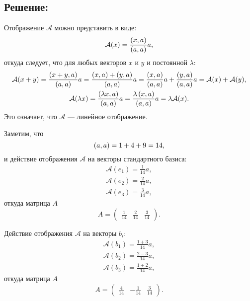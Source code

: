 \documentclass[12pt]{article}
\begin{document}
    \subsection*{Решение:}
    Отображение $\mathcal{A}$ можно представить в виде:
    \[
        \mathcal{A}(x)
        = \frac{\left ( x, a \right )}{\left ( a, a \right )} a ,
    \]
    откуда следует, что для любых векторов $x$ и $y$ и постоянной $\lambda$:
    \begin{gather*}
        \mathcal{A}(x + y)
        = \frac{\left ( x + y, a \right )}{\left ( a, a \right )} a
        = \frac{\left ( x, a \right ) + \left ( y, a \right )}{\left ( a, a \right )} a
        = \frac{\left ( x, a \right )}{\left ( a, a \right )} a + \frac{\left ( y, a \right )}{\left ( a, a \right )} a
        = \mathcal{A}(x) + \mathcal{A}(y), \\
        \mathcal{A}(\lambda x)
        = \frac{\left ( \lambda x, a \right )}{\left ( a, a \right )} a
        = \frac{\lambda  \left ( x, a \right )}{\left ( a, a \right )} a
        = \lambda \mathcal{A}(x) .
    \end{gather*}
    Это означает, что $\mathcal{A}$ --- линейное отображение.

    Заметим, что
    \[
        \left ( a, a \right ) = 1 + 4 + 9 = 14,
    \]
    и действие отображения $\mathcal{A}$ на векторы стандартного базиса:
    \begin{gather*}
        \mathcal{A}(e_1)
        = \frac{1}{14} a, \\
        \mathcal{A}(e_2)
        = \frac{2}{14} a, \\
        \mathcal{A}(e_3)
        = \frac{3}{14} a,
    \end{gather*}
    откуда матрица $A$
    \[
        A =
        \begin{pmatrix}
            \frac{1}{14} & \frac{2}{14} & \frac{3}{14}
        \end{pmatrix}.
    \]

    Действие отображения $\mathcal{A}$ на векторы $b_i$:
    \begin{gather*}
        \mathcal{A}(b_1)
        = \frac{1 + 3}{14} a, \\
        \mathcal{A}(b_2)
        = \frac{2 - 3}{14} a, \\
        \mathcal{A}(b_3)
        = \frac{1 + 2}{14} a,
    \end{gather*}
    откуда матрица $A$
    \[
        A =
        \begin{pmatrix}
            \frac{4}{14} & - \frac{1}{14} & \frac{3}{14}
        \end{pmatrix}
        .
    \]
\end{document}
